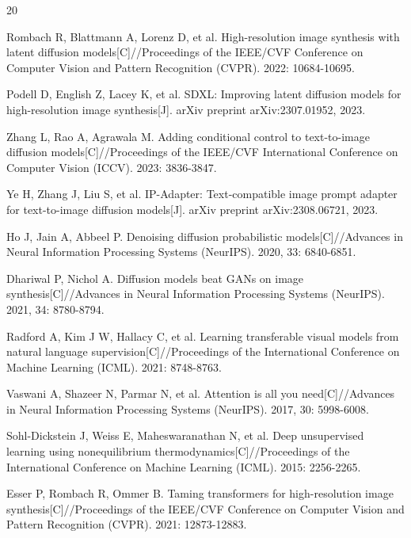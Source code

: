 \documentclass[12pt,a4paper]{ctexart}
\begin{document}
\newpage
\begin{thebibliography}{20}

 Rombach R, Blattmann A, Lorenz D, et al. High-resolution image synthesis with latent diffusion models[C]//Proceedings of the IEEE/CVF Conference on Computer Vision and Pattern Recognition (CVPR). 2022: 10684-10695.

 Podell D, English Z, Lacey K, et al. SDXL: Improving latent diffusion models for high-resolution image synthesis[J]. arXiv preprint arXiv:2307.01952, 2023.

 Zhang L, Rao A, Agrawala M. Adding conditional control to text-to-image diffusion models[C]//Proceedings of the IEEE/CVF International Conference on Computer Vision (ICCV). 2023: 3836-3847.

 Ye H, Zhang J, Liu S, et al. IP-Adapter: Text-compatible image prompt adapter for text-to-image diffusion models[J]. arXiv preprint arXiv:2308.06721, 2023.

 Ho J, Jain A, Abbeel P. Denoising diffusion probabilistic models[C]//Advances in Neural Information Processing Systems (NeurIPS). 2020, 33: 6840-6851.

 Dhariwal P, Nichol A. Diffusion models beat GANs on image synthesis[C]//Advances in Neural Information Processing Systems (NeurIPS). 2021, 34: 8780-8794.

 Radford A, Kim J W, Hallacy C, et al. Learning transferable visual models from natural language supervision[C]//Proceedings of the International Conference on Machine Learning (ICML). 2021: 8748-8763.

 Vaswani A, Shazeer N, Parmar N, et al. Attention is all you need[C]//Advances in Neural Information Processing Systems (NeurIPS). 2017, 30: 5998-6008.

 Sohl-Dickstein J, Weiss E, Maheswaranathan N, et al. Deep unsupervised learning using nonequilibrium thermodynamics[C]//Proceedings of the International Conference on Machine Learning (ICML). 2015: 2256-2265.

 Esser P, Rombach R, Ommer B. Taming transformers for high-resolution image synthesis[C]//Proceedings of the IEEE/CVF Conference on Computer Vision and Pattern Recognition (CVPR). 2021: 12873-12883.


\end{thebibliography}
\end{document}
